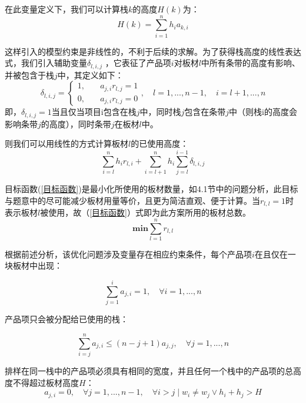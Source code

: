 \documentclass[bwprint]{gmcmthesis}
\begin{document}
在此变量定义下，我们可以计算栈$k$的高度$H(k)$为：
\begin{equation}
    H(k)=\sum_{i=1}^{n} h_i a_{k,i}
\end{equation}


这样引入的模型约束是非线性的，不利于后续的求解。为了获得栈高度的线性表达式，我们引入辅助变量$\delta_{l,i,j}$ ，它表征了产品项$i$对板材$l$中所有条带的高度有影响、并被包含于栈$j$中，其定义如下：
\begin{equation}
    \delta_{l,i,j}=  
    \begin{cases}
        1, \quad  & a_{j,i} r_{l,j}=1\\
        0, \quad  & a_{j,i} r_{l,j}=0
    \end{cases},\quad l=1,...,n-1, \quad i=l+1,...,n
\end{equation}
即，$\delta_{l,i,j} = 1$当且仅当项目i包含在栈$j$中，同时栈$j$包含在条带$j$中（则栈i的高度会影响条带$j$的高度），同时条带$j$在板材$l$中。

则我们可以用线性的方式计算板材$l$的已使用高度：
\begin{equation}
\sum_{i=l}^{n} h_i r_{l,i}+\sum_{i=l+1}^{n} h_i \sum_{j=l}^{i-1} \delta_{l,i,j}
\end{equation}

目标函数(\ref{目标函数})是最小化所使用的板材数量，如4.1节中的问题分析，此目标与题意中的尽可能减少板材用量等价，且更为简洁直观、便于计算。当$ r_{l,l}=1 $时表示板材$l$被使用，故（\ref{目标函数}）式即为此方案所用的板材总数。
\begin{equation}
    \mathbf{min}  \sum_{l=1}^{n}  r_{l,l} \label{目标函数}
 \end{equation}


根据前述分析，该优化问题涉及变量存在相应约束条件，每个产品项$i$在且仅在一块板材中出现：

\begin{equation}
    \sum_{j=1}^{i}  a_{j,i} =1,\quad \forall i=1,...,n \label{产品项必须排}
\end{equation}


产品项只会被分配给已使用的栈：

\begin{equation}
   \sum_{i=j}^{n}  a_{j,i} \le (n-j+1)a_{j,j},\quad \forall j=1,...,n  \label{产品项只给已使用栈}
\end{equation}

排样在同一栈中的产品项必须具有相同的宽度，并且任何一个栈中的产品项的总高度不得超过板材高度$H$：
\begin{equation}
     a_{j,i}=0, \quad \forall j=1,...,n-1,\quad  \forall i>j \mid w_i \neq w_j \vee h_i+h_j>H \label{相同宽度}
 \end{equation}
\end{document}
